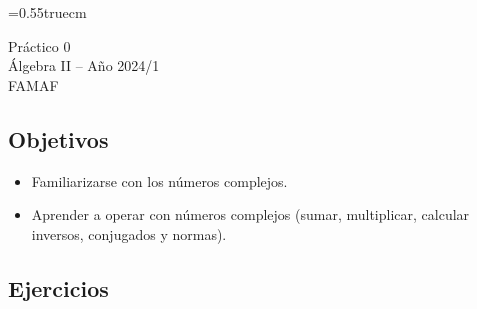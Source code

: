 \documentclass[a4paper,12pt,twoside,spanish,reqno]{amsbook}
\numberwithin{equation}{section}
\begin{document}
    \baselineskip=0.55truecm %
    
    
    {\bf \begin{center} Práctico 0 \\ Álgebra  II -- Año 2024/1 \\ FAMAF \end{center}}
    


\bigbreak

\subsection*{Objetivos}

\begin{itemize}
 \item Familiarizarse con los números complejos.
 \item Aprender a operar con números complejos (sumar, multiplicar, calcular inversos, conjugados y normas).
\end{itemize}

\subsection*{Ejercicios}
\end{document}
